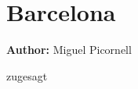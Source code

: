\section{Barcelona}
\label{ch:scenarios:barcelona}
\hfill \textbf{Author:} Miguel Picornell

zugesagt

